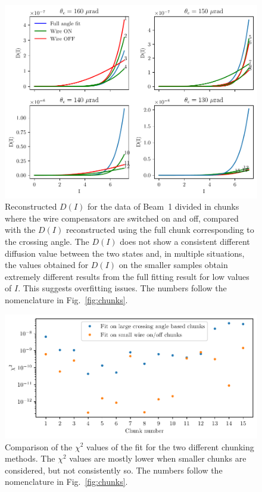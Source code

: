 \begin{figure}[hpt]
    \centering
    \includegraphics[width=1.0\textwidth]{5_wire_compensators_LHC/figs/fokker_planck_b1_turbo_bis.pdf}
    \caption{Reconstructed $D(I)$ for the data of Beam~1 divided in chunks where the wire compensators are switched on and off, compared with the $D(I)$ reconstructed using the full chunk corresponding to the crossing angle. The $D(I)$ does not show a consistent different diffusion value between the two states and, in multiple situations, the values obtained for $D(I)$ on the smaller samples obtain extremely different results from the full fitting result for low values of $I$. This suggests overfitting issues. The numbers follow the nomenclature in Fig.~\ref{fig:chunks}.}
    \label{fig:reconstruction_3}
\end{figure}

\begin{figure}[hpt]
    \centering
    \includegraphics[width=1.0\textwidth]{5_wire_compensators_LHC/figs/chi2_b1.pdf}
    \caption{Comparison of the $\chi^2$ values of the fit for the two different chunking methods. The $\chi^2$ values are mostly lower when smaller chunks are considered, but not consistently so. The numbers follow the nomenclature in Fig.~\ref{fig:chunks}.}
    \label{fig:chi2}
\end{figure}

